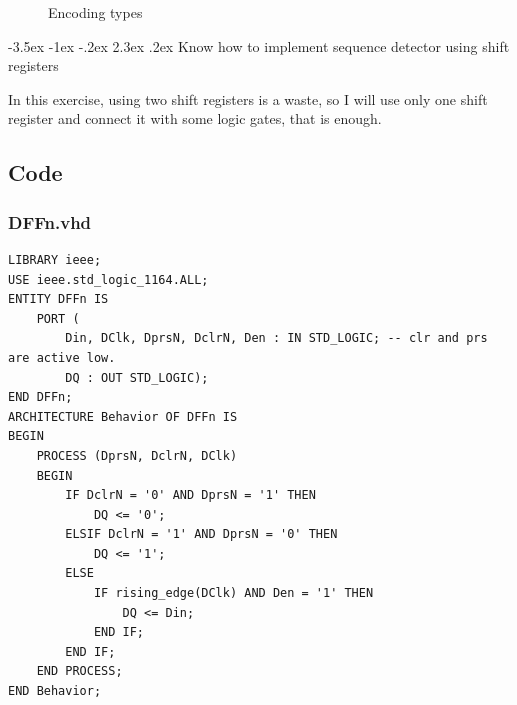 \documentclass[13pt,a4paper]{report}
\makeatletter
\renewcommand\section{\@startsection {section}{1}{-1em}%
  {-3.5ex \@plus -1ex \@minus -.2ex}%
  {2.3ex \@plus.2ex}%
  {\normalfont\Large\bfseries}}
\makeatother
\begin{document}
\begin{figure}[H]
\centering
{}
\caption*{Encoding types}
\end{figure}

\newpage
\section{Know how to implement sequence detector using shift registers}

In this exercise, using two shift registers is a waste, so I will use only one shift register and connect it with some logic gates, that is enough.

\subsection{Code}
\subsubsection{DFFn.vhd}
\begin{verbatim}
LIBRARY ieee;
USE ieee.std_logic_1164.ALL;
ENTITY DFFn IS
	PORT (
		Din, DClk, DprsN, DclrN, Den : IN STD_LOGIC; -- clr and prs are active low.
		DQ : OUT STD_LOGIC);
END DFFn;
ARCHITECTURE Behavior OF DFFn IS
BEGIN
	PROCESS (DprsN, DclrN, DClk)
	BEGIN
		IF DclrN = '0' AND DprsN = '1' THEN
			DQ <= '0';
		ELSIF DclrN = '1' AND DprsN = '0' THEN
			DQ <= '1';
		ELSE
			IF rising_edge(DClk) AND Den = '1' THEN
				DQ <= Din;
			END IF;
		END IF;
	END PROCESS;
END Behavior;
\end{verbatim}
\end{document}
